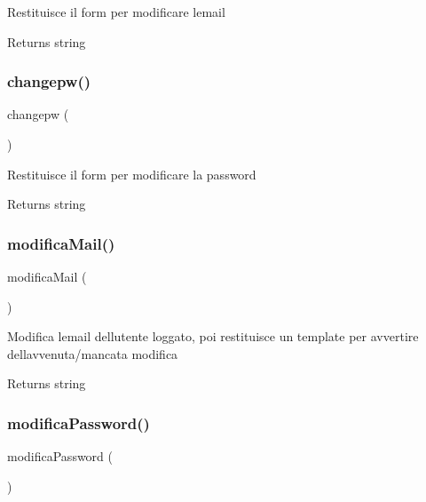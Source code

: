 Restituisce il form per modificare l\textquotesingle{}email

\begin{DoxyReturn}{Returns}
string 
\end{DoxyReturn}
\mbox{\label{class_c_utente_a8b06e08492800ad20e31dc9066cf0839}} 
\subsubsection{\texorpdfstring{changepw()}{changepw()}}
{\footnotesize\ttfamily changepw (\begin{DoxyParamCaption}{ }\end{DoxyParamCaption})}

Restituisce il form per modificare la password

\begin{DoxyReturn}{Returns}
string 
\end{DoxyReturn}
\mbox{\label{class_c_utente_a7090c2a3eb07813b3a5c163bf470f2fe}} 
\subsubsection{\texorpdfstring{modifica\+Mail()}{modificaMail()}}
{\footnotesize\ttfamily modifica\+Mail (\begin{DoxyParamCaption}{ }\end{DoxyParamCaption})}

Modifica l\textquotesingle{}email dell\textquotesingle{}utente loggato, poi restituisce un template per avvertire dell\textquotesingle{}avvenuta/mancata modifica

\begin{DoxyReturn}{Returns}
string 
\end{DoxyReturn}
\mbox{\label{class_c_utente_af3fc2d0291f11cc62479a15fa6167266}} 
\subsubsection{\texorpdfstring{modifica\+Password()}{modificaPassword()}}
{\footnotesize\ttfamily modifica\+Password (\begin{DoxyParamCaption}{ }\end{DoxyParamCaption})}

